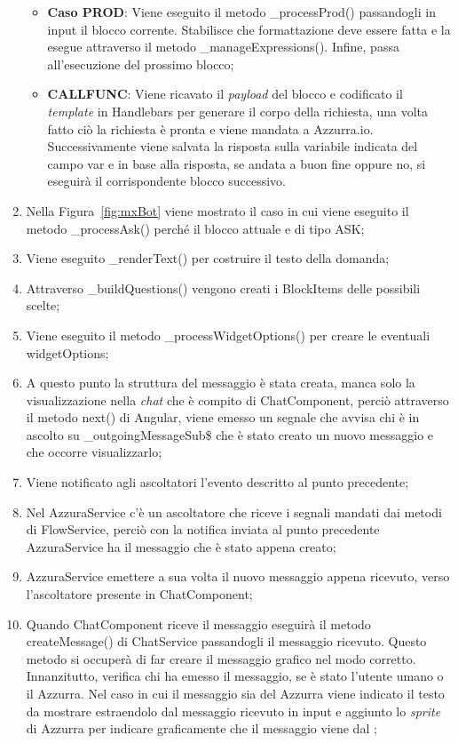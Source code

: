 \begin{enumerate}
\begin{itemize}
		\item \textbf{Caso PROD}: Viene eseguito il metodo \_processProd() passandogli in input il blocco corrente. Stabilisce che formattazione deve essere fatta e la esegue attraverso il metodo \_manageExpressions(). Infine, passa all'esecuzione del prossimo blocco;
		\item \textbf{CALLFUNC}: Viene ricavato il \emph{payload} del blocco e codificato il \emph{template} in Handlebars per generare il corpo della richiesta, una volta fatto ciò la richiesta è pronta e viene mandata a Azzurra.io. Successivamente viene salvata la risposta sulla variabile indicata del campo var e in base alla risposta, se andata a buon fine oppure no, si eseguirà il corrispondente blocco successivo.
	\end{itemize}	
	\item Nella Figura~\ref{fig:mxBot} viene mostrato il caso in cui viene eseguito il metodo \_processAsk() perché il blocco attuale e di tipo ASK;
	\item Viene eseguito \_renderText() per costruire il testo della domanda;
	\item Attraverso \_buildQuestions() vengono creati i BlockItems delle possibili scelte;
	\item Viene eseguito il metodo \_processWidgetOptions() per creare le eventuali widgetOptions;
	\item A questo punto la struttura del messaggio è stata creata, manca solo la visualizzazione nella \emph{chat} che è compito di ChatComponent, perciò attraverso il metodo next() di Angular, viene emesso un segnale che avvisa chi è in ascolto su \_outgoingMessageSub\$ che è stato creato un nuovo messaggio e che occorre visualizzarlo;
	\item Viene notificato agli ascoltatori l'evento descritto al punto precedente;
	\item Nel AzzuraService c'è un ascoltatore che riceve i segnali mandati dai metodi di FlowService, perciò con la notifica inviata al punto precedente AzzuraService ha il messaggio che è stato appena creato;
	\item AzzuraService emettere a sua volta il nuovo messaggio appena ricevuto, verso l'ascoltatore presente in ChatComponent;
	\item Quando ChatComponent riceve il messaggio eseguirà il metodo createMessage() di ChatService passandogli il messaggio ricevuto. Questo metodo si occuperà di far creare il messaggio grafico nel modo corretto.
	Innanzitutto, verifica chi ha emesso il messaggio, se è stato l'utente umano o il  Azzurra. Nel caso in cui il messaggio sia del  Azzurra viene indicato il testo da mostrare estraendolo dal messaggio ricevuto in input e aggiunto lo \emph{sprite} di Azzurra per indicare graficamente che il messaggio viene dal ;

\end{enumerate}
